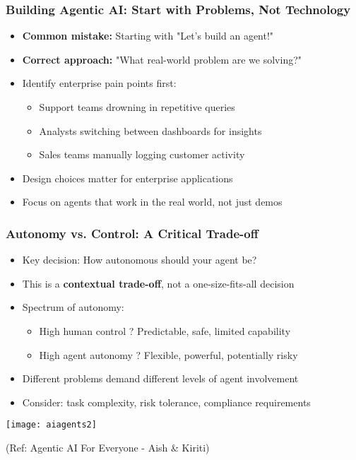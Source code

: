 \begin{frame}[fragile]\frametitle{Building Agentic AI: Start with Problems, Not Technology}
\begin{itemize}
    \item \textbf{Common mistake:} Starting with "Let's build an agent!"
    \item \textbf{Correct approach:} "What real-world problem are we solving?"
    \item Identify enterprise pain points first:
    \begin{itemize}
        \item Support teams drowning in repetitive queries
        \item Analysts switching between dashboards for insights
        \item Sales teams manually logging customer activity
    \end{itemize}
    \item Design choices matter for enterprise applications
    \item Focus on agents that work in the real world, not just demos
\end{itemize}
\end{frame}

\begin{frame}[fragile]\frametitle{Autonomy vs. Control: A Critical Trade-off}

		\begin{itemize}
			\item Key decision: How autonomous should your agent be?
			\item This is a \textbf{contextual trade-off}, not a one-size-fits-all decision
			\item Spectrum of autonomy:
			\begin{itemize}
				\item High human control ? Predictable, safe, limited capability
				\item High agent autonomy ? Flexible, powerful, potentially risky
			\end{itemize}
			\item Different problems demand different levels of agent involvement
			\item Consider: task complexity, risk tolerance, compliance requirements
		\end{itemize}

        \begin{center}
        \texttt{[image: aiagents2]}
		
		{\tiny (Ref: Agentic AI For Everyone - Aish \& Kiriti)}
        \end{center}

\end{frame}



